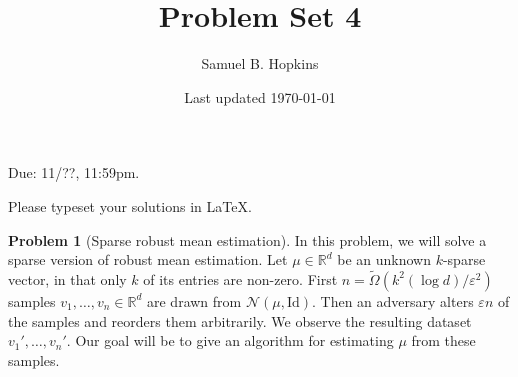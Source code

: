 \documentclass[11pt]{article}
\title{Problem Set 4}
\author{Samuel B. Hopkins}
\date{Last updated \today}
\theoremstyle{definition}
\newtheorem{problem}[theorem]{Problem}
\newcommand{\R}{\mathbb{R}} %
\renewcommand{\epsilon}{\varepsilon}
\newcommand{\Id}{\mathrm{Id}}
\begin{document}
\maketitle

Due: 11/??, 11:59pm.

Please typeset your solutions in LaTeX.

\begin{problem}[Sparse robust mean estimation]

  In this problem, we will solve a sparse version of robust mean estimation.  Let $\mu \in \R^d$ be an unknown $k$-sparse vector, in that only $k$ of its entries are non-zero.  First $n = \widetilde{\Omega}(k^2 (\log d)/\epsilon^2)$ samples $v_1, \dots, v_n \in \R^d$ are drawn from $\mathcal{N}(\mu, \Id)$. Then an adversary alters $\epsilon n$ of the samples and reorders them arbitrarily.  We observe the resulting dataset $v_1', \dots , v_n'$.   Our goal will be to give an algorithm for estimating $\mu$ from these samples.


\end{problem}
\end{document}
